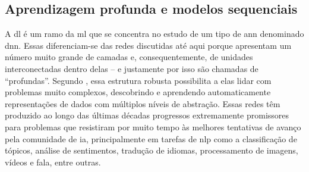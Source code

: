 
\subsection{Aprendizagem profunda e modelos sequenciais}
\label{sec:am-ap}

A \acrfull{dl} é um ramo da \acrlong{ml} que se concentra no estudo de um tipo de \acrshort{ann} denominado \acrfull{dnn}. 
Essas  diferenciam-se das redes discutidas até aqui porque apresentam um número muito grande de camadas e, consequentemente, de unidades interconectadas dentro delas -- e justamente por isso são chamadas de ``profundas''.
Segundo , essa estrutura robusta possibilita a elas lidar com problemas muito complexos, descobrindo e aprendendo automaticamente representações de dados com múltiplos níveis de abstração.
Essas redes têm produzido ao longo das últimas décadas progressos extremamente promissores para problemas que resistiram por muito tempo às melhores tentativas de avanço pela comunidade de \acrshort{ia}, principalmente em tarefas de \acrfull{nlp} como a classificação de tópicos, análise de sentimentos, tradução de idiomas,  processamento de imagens, vídeos e fala, entre outras.






